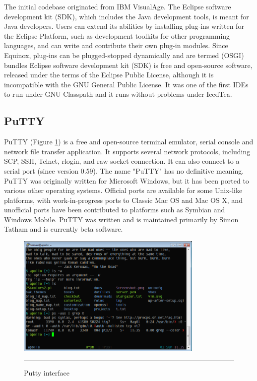 The initial codebase originated from IBM VisualAge. The Eclipse software development kit (SDK), which includes the Java development tools, is meant for Java developers. Users can extend its abilities by installing plug-ins written for the Eclipse Platform, such as development toolkits for other programming languages, and can write and contribute their own plug-in modules. Since Equinox, plug-ins can be plugged-stopped dynamically and are termed (OSGI) bundles Eclipse software development kit (SDK) is free and open-source software, released under the terms of the Eclipse Public License, although it is incompatible with the GNU General Public License. It was one of the first IDEs to run under GNU Classpath and it runs without problems under IcedTea.

\subsection{PuTTY}
PuTTY (Figure \ref{fig:putty}) is a free and open-source terminal emulator, serial console and network file transfer application. It supports several network protocols, including SCP, SSH, Telnet, rlogin, and raw socket connection. It can also connect to a serial port (since version 0.59). The name "PuTTY" has no definitive meaning.
PuTTY was originally written for Microsoft Windows, but it has been ported to various other operating systems. Official ports are available for some Unix-like platforms, with work-in-progress ports to Classic Mac OS and Mac OS X, and unofficial ports have been contributed to platforms such as Symbian and Windows Mobile.
PuTTY was written and is maintained primarily by Simon Tatham and is currently beta software.
\begin{figure}[h!]
	\centering
	\vspace{-0.2cm}
	\includegraphics[width=0.8\textwidth]{./images/putty_tango.png}
	\rule{1\textwidth}{1pt}
	\caption{Putty interface}
	\label{fig:putty}
\end{figure}
\clearpage

